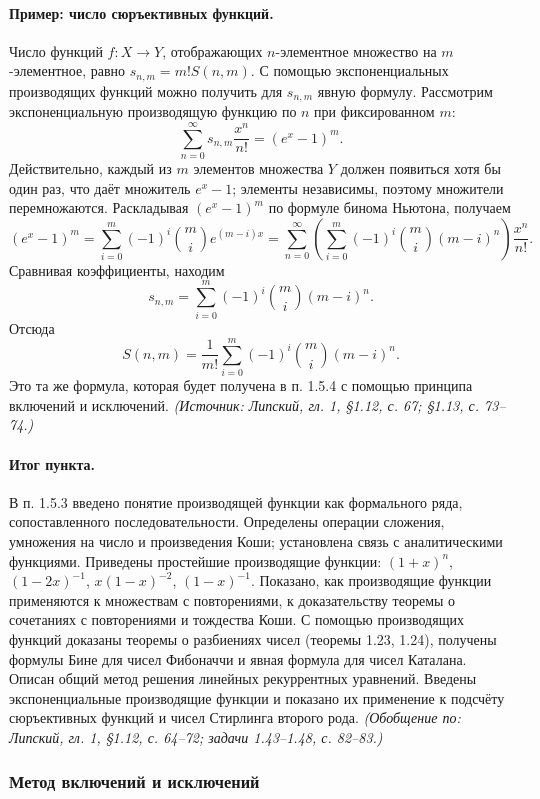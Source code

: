 \documentclass[a4paper,12pt]{article}
\begin{document}
\paragraph{Пример: число сюръективных функций.}
Число функций \(f:X\to Y\), отображающих \(n\)-элементное множество на \(m\)-элементное, равно \(s_{n,m}=m!S(n,m)\). С помощью экспоненциальных производящих функций можно получить для \(s_{n,m}\) явную формулу. Рассмотрим экспоненциальную производящую функцию по \(n\) при фиксированном \(m\):
\[
\sum_{n=0}^{\infty}s_{n,m}\frac{x^n}{n!}=(e^x-1)^m.
\]
Действительно, каждый из \(m\) элементов множества \(Y\) должен появиться хотя бы один раз, что даёт множитель \(e^x-1\); элементы независимы, поэтому множители перемножаются. Раскладывая \((e^x-1)^m\) по формуле бинома Ньютона, получаем
\[
(e^x-1)^m=\sum_{i=0}^{m}(-1)^i\binom{m}{i}e^{(m-i)x}
=\sum_{n=0}^{\infty}\left(\sum_{i=0}^{m}(-1)^i\binom{m}{i}(m-i)^n\right)\frac{x^n}{n!}.
\]
Сравнивая коэффициенты, находим
\[
s_{n,m}=\sum_{i=0}^{m}(-1)^i\binom{m}{i}(m-i)^n.
\]
Отсюда
\[
S(n,m)=\frac{1}{m!}\sum_{i=0}^{m}(-1)^i\binom{m}{i}(m-i)^n.
\]
Это та же формула, которая будет получена в п. 1.5.4 с помощью принципа включений и исключений.
\textit{(Источник: Липский, гл. 1, §1.12, с. 67; §1.13, с. 73--74.)}

\paragraph{Итог пункта.}
В п. 1.5.3 введено понятие производящей функции как формального ряда, сопоставленного последовательности. Определены операции сложения, умножения на число и произведения Коши; установлена связь с аналитическими функциями. Приведены простейшие производящие функции: \((1+x)^n\), \((1-2x)^{-1}\), \(x(1-x)^{-2}\), \((1-x)^{-1}\). Показано, как производящие функции применяются к множествам с повторениями, к доказательству теоремы о сочетаниях с повторениями и тождества Коши. С помощью производящих функций доказаны теоремы о разбиениях чисел (теоремы 1.23, 1.24), получены формулы Бине для чисел Фибоначчи и явная формула для чисел Каталана. Описан общий метод решения линейных рекуррентных уравнений. Введены экспоненциальные производящие функции и показано их применение к подсчёту сюръективных функций и чисел Стирлинга второго рода.
\textit{(Обобщение по: Липский, гл. 1, §1.12, с. 64--72; задачи 1.43--1.48, с. 82--83.)}

\subsubsection{Метод включений и исключений}
\end{document}
